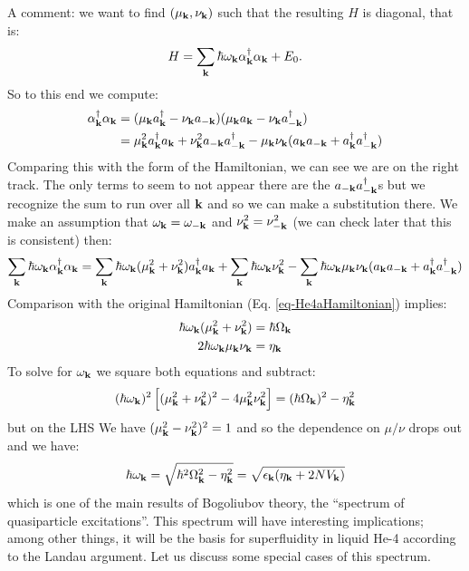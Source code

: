 A comment: we want to find $(\mu_{\mathbf{k}}, \nu_{\mathbf{k}})$ such that the resulting $H$ is diagonal, that is:
\begin{equation}
    H = \sum_{\mathbf{k}}\hbar \omega_{\mathbf{k}}\alpha^\dagger_{\mathbf{k}}\alpha_{\mathbf{k}} + E_0.
\end{equation}
So to this end we compute:
\begin{equation}
    \begin{split}
        \alpha^\dagger_{\mathbf{k}}\alpha_{\mathbf{k}} &= (\mu_{\mathbf{k}}a^\dagger_{\mathbf{k}} - \nu_{\mathbf{k}}a_{-\mathbf{k}})(\mu_{\mathbf{k}}a_{\mathbf{k}} - \nu_{\mathbf{k}}a^\dagger_{-\mathbf{k}})
        \\ &= \mu_{\mathbf{k}}^2a^\dagger_{\mathbf{k}}a_{\mathbf{k}} + \nu_{\mathbf{k}}^2a_{-\mathbf{k}}a^\dagger_{-\mathbf{k}} - \mu_{\mathbf{k}}\nu_{\mathbf{k}}(a_{\mathbf{k}}a_{-\mathbf{k}} + a^\dagger_{\mathbf{k}}a^\dagger_{-\mathbf{k}})
    \end{split}
\end{equation}
Comparing this with the form of the Hamiltonian, we can see we are on the right track. The only terms to seem to not appear there are the $a_{-\mathbf{k}}a^\dagger_{-\mathbf{k}}$s but we recognize the sum to run over all $\mathbf{k}$ and so we can make a substitution there. We make an assumption that $\omega_{\mathbf{k}} = \omega_{-\mathbf{k}}$ and $\nu_{\mathbf{k}}^2 = \nu_{-\mathbf{k}}^2$ (we can check later that this is consistent) then:
\begin{equation}
    \sum_{\mathbf{k}}\hbar \omega_{\mathbf{k}}\alpha^\dagger_{\mathbf{k}}\alpha_{\mathbf{k}} =  \sum_{\mathbf{k}}\hbar \omega_{\mathbf{k}}(\mu_{\mathbf{k}}^2 + \nu_{\mathbf{k}}^2)a^\dagger_{\mathbf{k}}a_{\mathbf{k}} + \sum_{\mathbf{k}}\hbar \omega_{\mathbf{k}}\nu_{\mathbf{k}}^2 - \sum_{\mathbf{k}}\hbar \omega_{\mathbf{k}}\mu_{\mathbf{k}}\nu_{\mathbf{k}}(a_{\mathbf{k}}a_{-\mathbf{k}} + a^\dagger_{\mathbf{k}}a^\dagger_{-\mathbf{k}})
\end{equation}
Comparison with the original Hamiltonian (Eq. \eqref{eq-He4aHamiltonian}) implies:
\begin{equation}
    \begin{split}
        \hbar \omega_{\mathbf{k}}(\mu_{\mathbf{k}}^2 + \nu_{\mathbf{k}}^2) &= \hbar \Omega_{\mathbf{k}}
    \\ 2\hbar \omega_{\mathbf{k}}\mu_{\mathbf{k}}\nu_{\mathbf{k}} &= \eta_{\mathbf{k}}
    \end{split}
\end{equation}
To solve for $\omega_{\mathbf{k}}$ we square both equations and subtract:
\begin{align*}
    (\hbar \omega_{\mathbf{k}})^2\left[(\mu_{\mathbf{k}}^2 + \nu_{\mathbf{k}}^2)^2 - 4\mu_{\mathbf{k}}^2\nu_{\mathbf{k}}^2\right] = (\hbar\Omega_{\mathbf{k}})^2 - \eta_{\mathbf{k}}^2
\end{align*}
but on the LHS We have $(\mu_{\mathbf{k}}^2 - \nu_{\mathbf{k}}^2)^2 = 1$ and so the dependence on $\mu/\nu$ drops out and we have:
\begin{equation}
    \hbar\omega_{\mathbf{k}} = \sqrt{\hbar^2\Omega_{\mathbf{k}}^2 - \eta_{\mathbf{k}}^2} = \sqrt{\epsilon_{\mathbf{k}}(\eta_{\mathbf{k}} + 2NV_{\mathbf{k}})}
\end{equation}
which is one of the main results of Bogoliubov theory, the ``spectrum of quasiparticle excitations''. This spectrum will have interesting implications; among other things, it will be the basis for superfluidity in liquid He-4 according to the Landau argument. Let us discuss some special cases of this spectrum. 

